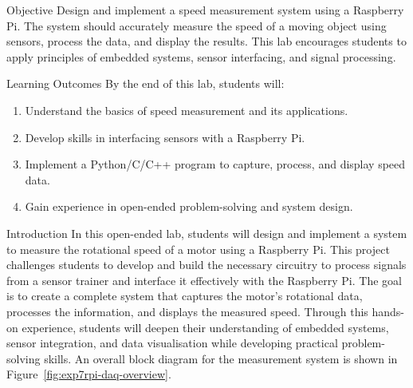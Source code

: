 
\begin{labsection}{Objective}
  Design and implement a speed measurement system using a Raspberry Pi. The system should accurately measure the speed of a moving object using sensors, process the data, and display the results. This lab encourages students to apply principles of embedded systems, sensor interfacing, and signal processing.
\end{labsection}

\begin{labsection}{Learning Outcomes}
  By the end of this lab, students will:
  \begin{enumerate}
    \item Understand the basics of speed measurement and its applications.
    \item Develop skills in interfacing sensors with a Raspberry Pi.
    \item Implement a Python/C/C++ program to capture, process, and display speed data.
    \item Gain experience in open-ended problem-solving and system design.
  \end{enumerate}
\end{labsection}

\begin{labsection}{Introduction}
  In this open-ended lab, students will design and implement a system to measure the rotational speed of a motor using a Raspberry Pi. This project challenges students to develop and build the necessary circuitry to process signals from a sensor trainer and interface it effectively with the Raspberry Pi. The goal is to create a complete system that captures the motor's rotational data, processes the information, and displays the measured speed. Through this hands-on experience, students will deepen their understanding of embedded systems, sensor integration, and data visualisation while developing practical problem-solving skills. An overall block diagram for the measurement system is shown in Figure~\ref{fig:exp7rpi-daq-overview}.
\end{labsection}

